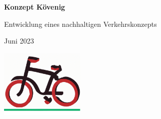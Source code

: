 \documentclass{article}
\begin{document}
	\begin{titlepage}
		\centering
		\vspace*{2cm}
		{\Huge\bfseries Konzept Kövenig\par}
		\vspace{1cm}
		{\Large Entwicklung eines nachhaltigen Verkehrskonzepts}
		\vfill
		{\large Juni 2023\par}
		\vspace*{1cm}
		\includegraphics[width=0.3\textwidth]{logo.png}
	\end{titlepage}
	
	\tableofcontents
	
        
         
        
        
        
        
        
	 
	
\end{document}
